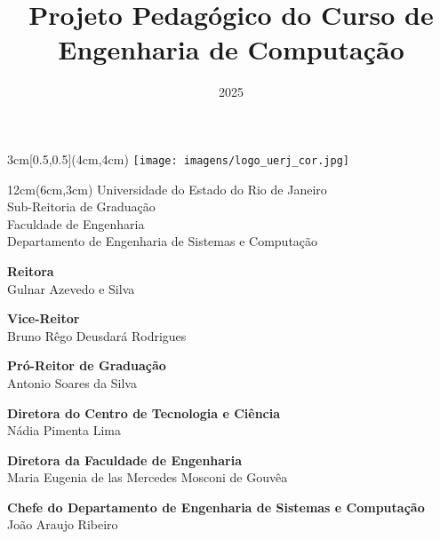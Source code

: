 \documentclass[oneside,envcountsame,envcountchap,openany]{svmono}
\begin{document}

\begin{textblock*}{3cm}[0.5,0.5](4cm,4cm)
  \texttt{[image: imagens/logo\_uerj\_cor.jpg]}
\end{textblock*}
\begin{textblock*}{12cm}(6cm,3cm)   %
  Universidade do Estado do Rio de Janeiro\\
  Sub-Reitoria de Graduação \\
  Faculdade de Engenharia\\
  Departamento de Engenharia de Sistemas e Computação
\end{textblock*}

\title{Projeto Pedagógico do Curso de Engenharia de Computação}
\subtitle{2025}
\date{} %
\maketitle
\vfill
\thispagestyle{empty} %
\newpage

{\textbf{Reitora}} \\
Gulnar Azevedo e Silva


  {\textbf{Vice-Reitor}} \\
Bruno Rêgo Deusdará Rodrigues

  {\textbf{Pró-Reitor de Graduação}} \\
Antonio Soares da Silva

  {\textbf{Diretora do Centro de Tecnologia e Ciência}} \\
Nádia Pimenta Lima

  {\textbf{Diretora da Faculdade de Engenharia}} \\
Maria Eugenia de las Mercedes Mosconi de Gouvêa

{\textbf{Chefe do Departamento de Engenharia de Sistemas e Computação}} \\
João Araujo Ribeiro

\newpage

\tableofcontents
\listoftables
\clearpage

\frontmatter%

\mainmatter%
\end{document}
